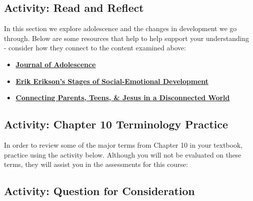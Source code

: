 \documentclass[
]{book}
\providecommand{\tightlist}{%
  \setlength{\itemsep}{0pt}\setlength{\parskip}{0pt}}
\begin{document}
\hypertarget{activity-read-and-reflect-1}{%
\subsection*{Activity: Read and Reflect}\label{activity-read-and-reflect-1}}

\begin{reflect}
In this section we explore adolescence and the changes in development we go through. Below are some resources that help to help support your understanding - consider how they connect to the content examined above:

\begin{itemize}
\tightlist
\item
  \href{https://www.sciencedirect.com/journal/journal-of-adolescence}{\textbf{Journal of Adolescence}}\\
\item
  \href{https://childdevelopmentinfo.com/child-development/erickson/\#gs.d8mpcv}{\textbf{Erik Erikson's Stages of Social-Emotional Development}}\\
\item
  \href{https://axis.org/}{\textbf{Connecting Parents, Teens, \& Jesus in a Disconnected World}}
\end{itemize}
\end{reflect}

\hypertarget{activity-chapter-10-terminology-practice}{%
\subsection*{Activity: Chapter 10 Terminology Practice}\label{activity-chapter-10-terminology-practice}}

\begin{reflect}
In order to review some of the major terms from Chapter 10 in your textbook, practice using the activity below. Although you will not be evaluated on these terms, they will assist you in the assessments for this course:
\end{reflect}

\hypertarget{activity-question-for-consideration-1}{%
\subsection*{Activity: Question for Consideration}\label{activity-question-for-consideration-1}}
\end{document}
